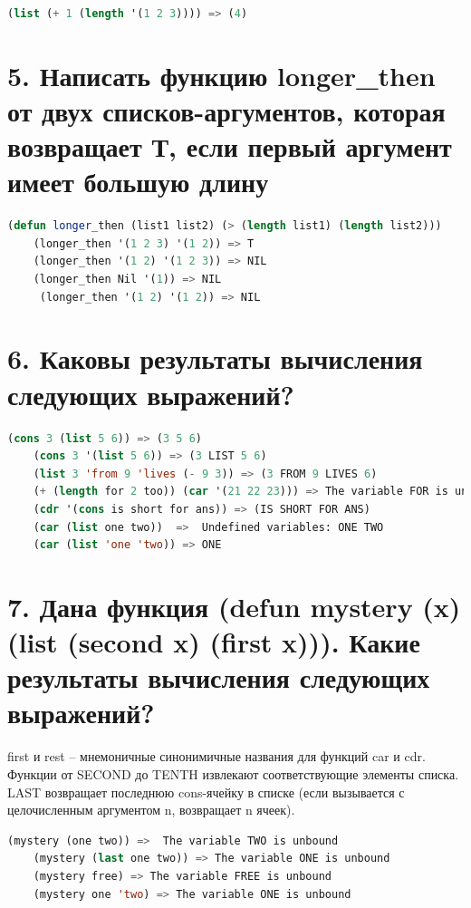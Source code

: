 \documentclass[12pt]{report}
\begin{document}
\begin{lstlisting}[language=Lisp]
	(list (+ 1 (length '(1 2 3)))) => (4)
\end{lstlisting}






\section*{5. Написать функцию longer\_then от двух списков-аргументов, которая возвращает Т, если первый аргумент имеет большую длину}

\begin{lstlisting}[language=Lisp]
	(defun longer_then (list1 list2) (> (length list1) (length list2)))
	(longer_then '(1 2 3) '(1 2)) => T
	(longer_then '(1 2) '(1 2 3)) => NIL
	(longer_then Nil '(1)) => NIL
	 (longer_then '(1 2) '(1 2)) => NIL
\end{lstlisting}

\section*{6. Каковы результаты вычисления следующих выражений?}

\begin{lstlisting}[language=Lisp]
	(cons 3 (list 5 6)) => (3 5 6)
	(cons 3 '(list 5 6)) => (3 LIST 5 6)
	(list 3 'from 9 'lives (- 9 3)) => (3 FROM 9 LIVES 6)
	(+ (length for 2 too)) (car '(21 22 23))) => The variable FOR is unbound.
	(cdr '(cons is short for ans)) => (IS SHORT FOR ANS)
	(car (list one two))  =>  Undefined variables: ONE TWO
	(car (list 'one 'two)) => ONE
\end{lstlisting}


\section*{7. Дана функция (defun mystery (x) (list (second x) (first x))). Какие результаты вычисления следующих выражений?}

first и rest -- мнемоничные синонимичные названия для функций car и cdr. Функции от SECOND до TENTH извлекают соответствующие элементы списка. LAST	возвращает последнюю cons-ячейку в списке (если вызывается с целочисленным аргументом n, возвращает n ячеек).

\begin{lstlisting}[language=Lisp]
	(mystery (one two)) =>  The variable TWO is unbound 
	(mystery (last one two)) => The variable ONE is unbound
	(mystery free) => The variable FREE is unbound
	(mystery one 'two) => The variable ONE is unbound
\end{lstlisting}
\end{document}
